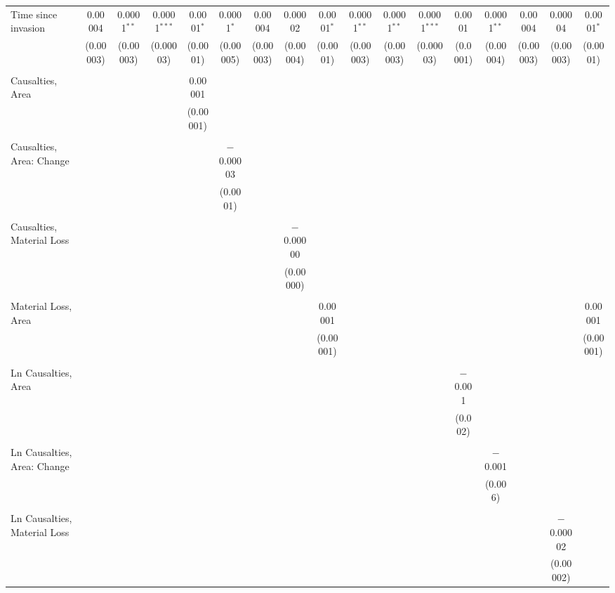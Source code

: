 \begin{table}[!htbp]
\begin{tabular}{@{\extracolsep{5pt}}lcccccccccccccccc}
 Time since invasion & 0.00004 & 0.0001$^{**}$ & 0.0001$^{***}$ & 0.0001$^{*}$ & 0.0001$^{*}$ & 0.00004 & 0.00002 & 0.0001$^{*}$ & 0.0001$^{**}$ & 0.0001$^{**}$ & 0.0001$^{***}$ & 0.0001 & 0.0001$^{**}$ & 0.00004 & 0.00004 & 0.0001$^{*}$ \\ 
  & (0.00003) & (0.00003) & (0.00003) & (0.0001) & (0.00005) & (0.00003) & (0.00004) & (0.0001) & (0.00003) & (0.00003) & (0.00003) & (0.0001) & (0.00004) & (0.00003) & (0.00003) & (0.0001) \\ 
  & & & & & & & & & & & & & & & & \\ 
 Causalties, Area &  &  &  & 0.00001 &  &  &  &  &  &  &  &  &  &  &  &  \\ 
  &  &  &  & (0.00001) &  &  &  &  &  &  &  &  &  &  &  &  \\ 
  & & & & & & & & & & & & & & & & \\ 
 Causalties, Area: Change &  &  &  &  & $-$0.00003 &  &  &  &  &  &  &  &  &  &  &  \\ 
  &  &  &  &  & (0.0001) &  &  &  &  &  &  &  &  &  &  &  \\ 
  & & & & & & & & & & & & & & & & \\ 
 Causalties, Material Loss &  &  &  &  &  &  & $-$0.00000 &  &  &  &  &  &  &  &  &  \\ 
  &  &  &  &  &  &  & (0.00000) &  &  &  &  &  &  &  &  &  \\ 
  & & & & & & & & & & & & & & & & \\ 
 Material Loss, Area &  &  &  &  &  &  &  & 0.00001 &  &  &  &  &  &  &  & 0.00001 \\ 
  &  &  &  &  &  &  &  & (0.00001) &  &  &  &  &  &  &  & (0.00001) \\ 
  & & & & & & & & & & & & & & & & \\ 
 Ln Causalties, Area &  &  &  &  &  &  &  &  &  &  &  & $-$0.001 &  &  &  &  \\ 
  &  &  &  &  &  &  &  &  &  &  &  & (0.002) &  &  &  &  \\ 
  & & & & & & & & & & & & & & & & \\ 
 Ln Causalties, Area: Change &  &  &  &  &  &  &  &  &  &  &  &  & $-$0.001 &  &  &  \\ 
  &  &  &  &  &  &  &  &  &  &  &  &  & (0.006) &  &  &  \\ 
  & & & & & & & & & & & & & & & & \\ 
 Ln Causalties, Material Loss &  &  &  &  &  &  &  &  &  &  &  &  &  &  & $-$0.00002 &  \\ 
  &  &  &  &  &  &  &  &  &  &  &  &  &  &  & (0.00002) &  \\ 

\end{tabular}
\end{table}

